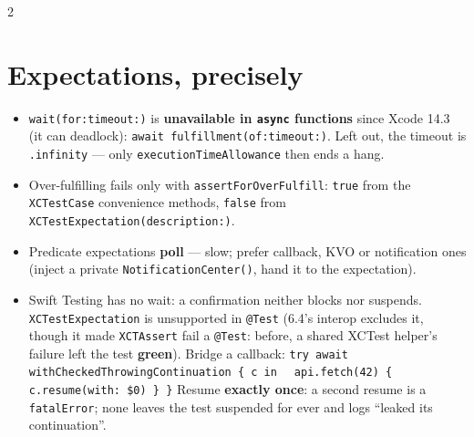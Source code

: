 \documentclass[8pt]{extarticle}
\newcommand\ct[1]{\texttt{#1}}
\begin{document}
\begin{multicols}{2}
\section{Expectations, precisely}
\begin{itemize}
  \item \ct{wait(for:timeout:)} is \textbf{unavailable in \ct{async} functions} since Xcode 14.3
        (it can deadlock): \ct{await fulfillment(of:timeout:)}. Left out, the timeout is
        \ct{.infinity} — only \ct{executionTimeAllowance} then ends a hang.
  \item Over-fulfilling fails only with \ct{assertForOverFulfill}: \ct{true} from the
        \ct{XCTestCase} convenience methods, \ct{false} from \ct{XCTestExpectation(description:)}.
  \item Predicate expectations \textbf{poll} — slow; prefer callback, KVO or notification ones
        (inject a private \ct{NotificationCenter()}, hand it to the expectation).
  \item Swift Testing has no wait: a confirmation neither blocks nor suspends. \ct{XCTestExpectation}
        is unsupported in \ct{@Test} (6.4's interop excludes it, though it made \ct{XCTAssert} fail a \ct{@Test}: before, a shared XCTest helper's failure left the test \textbf{green}).
        Bridge a callback:\newline
        \ct{try await withCheckedThrowingContinuation \{ c in}\newline
        \ct{\ \ api.fetch(42) \{ c.resume(with: \$0) \} \}}\newline
        Resume \textbf{exactly once}: a second resume is a \ct{fatalError}; none leaves the test
        suspended for ever and logs ``leaked its continuation''.
\end{itemize}


\end{multicols}
\end{document}
